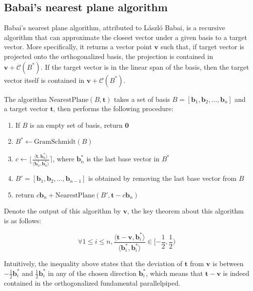 \documentclass[letterpaper,12pt]{article}
\begin{document}
\subsection{Babai's nearest plane algorithm}
Babai's nearest plane algorithm, attributed to László Babai, is a recursive algorithm that can approximate the closest vector under a given basis to a target vector. More specifically, it returns a vector point $\mathbf{v}$ such that, if target vector is projected onto the orthogonalized basis, the projection is contained in $\mathbf{v} + \mathcal{C}(B^\ast)$. If the target vector is in the linear span of the basis, then the target vector itself is contained in $\mathbf{v} + \mathcal{C}(B^\ast)$.

The algorithm $\text{NearestPlane}(B, \mathbf{t})$ takes a set of basis $B = [\mathbf{b}_1, \mathbf{b}_2, \ldots, \mathbf{b}_{n}]$ and a target vector $\mathbf{t}$, then performs the following procedure:

\begin{enumerate}
    \item If $B$ is an empty set of basis, return $\mathbf{0}$
    \item $B^\ast \leftarrow \text{GramSchmidt}(B)$
    \item $c \leftarrow \lfloor \frac{\langle\mathbf{t}, \mathbf{b}_n^\ast\rangle}{\langle\mathbf{b}_n^\ast, \mathbf{b}_n^\ast\rangle} \rceil$, where $\mathbf{b}_n^\ast$ is the last base vector in $B^\ast$
    \item $B' = [\mathbf{b}_1, \mathbf{b}_2, \ldots, \mathbf{b}_{n-1}]$ is obtained by removing the last base vector from $B$
    \item return $c\mathbf{b}_n + \text{NearestPlane}(B', \mathbf{t} - c\mathbf{b}_n)$
\end{enumerate}



Denote the output of this algorithm by $\mathbf{v}$, the key theorem about this algorithm is as follows:

$$
\forall 1 \leq i \leq n, 
\frac{
    \langle
        \mathbf{t} - \mathbf{v}, \mathbf{b}_i^\ast
    \rangle
}{
    \langle
        \mathbf{b}_i^\ast, \mathbf{b}_i^\ast
    \rangle
} 
\in [-\frac{1}{2}, \frac{1}{2})
$$

Intuitively, the inequality above states that the deviation of $\mathbf{t}$ from $\mathbf{v}$ is between $-\frac{1}{2}\mathbf{b}_i^\ast$ and $\frac{1}{2}\mathbf{b}_i^\ast$ in any of the chosen direction $\mathbf{b}_i^\ast$, which means that $\mathbf{t} - \mathbf{v}$ is indeed contained in the orthogonalized fundamental parallelpiped.
\end{document}
